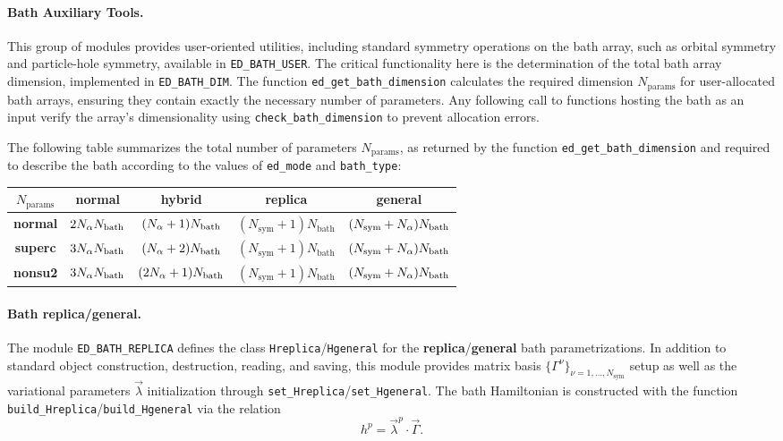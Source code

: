 \documentclass[edipack_sp.tex]{subfiles}
\begin{document}
\paragraph{Bath Auxiliary Tools.}
This group of modules provides user-oriented utilities, including 
standard symmetry operations on the bath array, such as orbital 
symmetry and particle-hole symmetry, available in 
{\tt ED\_BATH\_USER}. The critical functionality here is the 
determination of the total bath array dimension, implemented in 
{\tt ED\_BATH\_DIM}. The function {\tt ed\_get\_bath\_dimension} 
calculates the required dimension $N_\mathrm{params}$ for user-allocated bath 
arrays, ensuring they contain exactly the necessary number of 
parameters. Any following call
to functions hosting the bath as an input verify the array's 
dimensionality using {\tt check\_bath\_dimension} to prevent 
allocation errors.

The following table summarizes the total number of parameters $N_\mathrm{params}$, as returned by the function {\tt ed\_get\_bath\_dimension} and required to describe the bath according to the values of {\tt ed\_mode} and {\tt bath\_type}:

\begin{center}
\begin{tabular}{ |c||c|c|c|c| } 
 \hline     
 $N_\mathrm{params}$ & {\bf normal} & {\bf hybrid} & {\bf replica} & {\bf general}\\
 \hline 
 \hline    
 {\bf normal} & 
 $2N_\alpha N_\mathrm{bath}$ & 
 $(N_\alpha+1)N_\mathrm{bath}$ & 
 $(N_\mathrm{sym}+1)N_\mathrm{bath}$ & 
 $(N_\mathrm{sym}+N_\alpha)N_\mathrm{bath}$\\
 \hline
   {\bf superc} & $3N_\alpha N_\mathrm{bath}$ & 
 $(N_\alpha+2)N_\mathrm{bath}$ & 
 $(N_\mathrm{sym}+1)N_\mathrm{bath}$ & 
 $(N_\mathrm{sym}+N_\alpha)N_\mathrm{bath}$\\
 \hline
   {\bf nonsu2} & $3N_\alpha N_\mathrm{bath}$ & 
 $(2N_\alpha+1)N_\mathrm{bath}$ & 
 $(N_\mathrm{sym}+1)N_\mathrm{bath}$ & 
 $(N_\mathrm{sym}+N_\alpha)N_\mathrm{bath}$\\
 \hline
\end{tabular}
\end{center}

\paragraph{Bath replica/general.}
The module {\tt ED\_BATH\_REPLICA} defines the class {\tt Hreplica}/{\tt Hge\-ne\-ral} for the {\bf replica}/{\bf general} bath parametrizations. In  addition to standard object construction, destruction, reading, and saving, this module provides matrix basis  
$\{ \Gamma^\nu \}_{\nu=1,\dots,N_\mathrm{sym}}$ setup as well as  the variational parameters $\vec{\lambda}$ initialization through {\tt set\_Hreplica}/{\tt set\_Hge\-ne\-ral}. 
%
The bath Hamiltonian is constructed with the function 
{\tt build\_Hreplica}/{\tt build\_Hge\-ne\-ral} via the relation
$$
h^p = \vec{\lambda}^p \cdot \vec{\Gamma}.
$$
\end{document}
